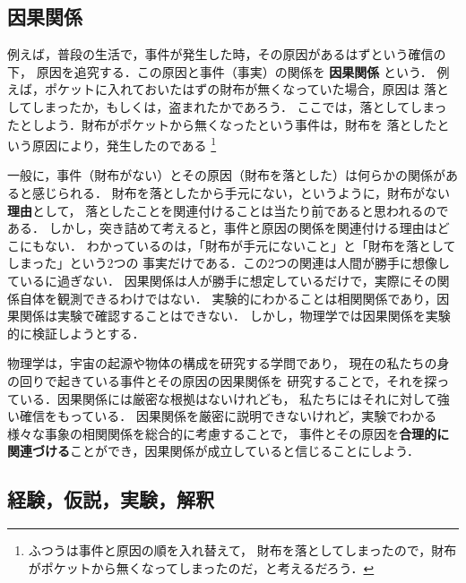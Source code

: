         \subsection{因果関係}
            例えば，普段の生活で，事件が発生した時，その原因があるはずという確信の下，
            原因を追究する．この原因と事件（事実）の関係を \textbf{因果関係} という．
            例えば，ポケットに入れておいたはずの財布が無くなっていた場合，原因は
            落としてしまったか，もしくは，盗まれたかであろう．
            ここでは，落としてしまったとしよう．財布がポケットから無くなったという事件は，財布を
            落としたという原因により，発生したのである
                \footnote{
                    ふつうは事件と原因の順を入れ替えて，
                    財布を落としてしまったので，財布がポケットから無くなってしまったのだ，と考えるだろう．
                }

            一般に，事件（財布がない）とその原因（財布を落とした）は何らかの関係があると感じられる．
            財布を落としたから手元にない，というように，財布がない\textbf{理由}として，
            落としたことを関連付けることは当たり前であると思われるのである．
            しかし，突き詰めて考えると，事件と原因の関係を関連付ける理由はどこにもない．
            わかっているのは，「財布が手元にないこと」と「財布を落としてしまった」という2つの
            事実だけである．この2つの関連は人間が勝手に想像しているに過ぎない．
            因果関係は人が勝手に想定しているだけで，実際にその関係自体を観測できるわけではない．
            実験的にわかることは相関関係であり，因果関係は実験で確認することはできない．
            しかし，物理学では因果関係を実験的に検証しようとする．

            物理学は，宇宙の起源や物体の構成を研究する学問であり，
            現在の私たちの身の回りで起きている事件とその原因の因果関係を
            研究することで，それを探っている．因果関係には厳密な根拠はないけれども，
            私たちにはそれに対して強い確信をもっている．
            因果関係を厳密に説明できないけれど，実験でわかる様々な事象の相関関係を総合的に考慮することで，
            事件とその原因を\textbf{合理的に関連づける}ことができ，因果関係が成立していると信じることにしよう．


        \subsection{経験，仮説，実験，解釈}
